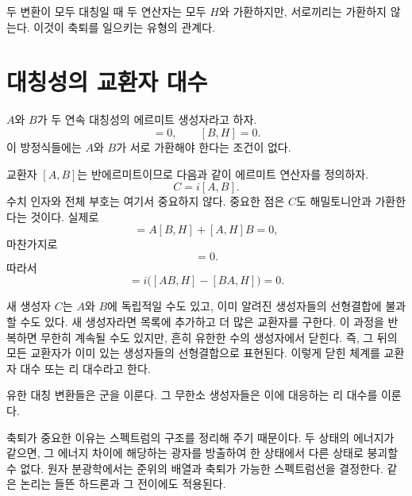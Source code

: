 두 변환이 모두 대칭일 때 두 연산자는 모두 \(H\)와 가환하지만, 서로끼리는 가환하지 않는다. 이것이 축퇴를 일으키는 유형의 관계다.

\begin{classroomqa}
\end{classroomqa}

\section{대칭성의 교환자 대수}

\(A\)와 \(B\)가 두 연속 대칭성의 에르미트 생성자라고 하자.
\begin{equation}
[A,H]=0,
\qquad
[B,H]=0.
\end{equation}
이 방정식들에는 \(A\)와 \(B\)가 서로 가환해야 한다는 조건이 없다.

교환자 \([A,B]\)는 반에르미트이므로 다음과 같이 에르미트 연산자를 정의하자.
\begin{equation}
C=i[A,B].
\end{equation}
수치 인자와 전체 부호는 여기서 중요하지 않다. 중요한 점은 \(C\)도 해밀토니안과 가환한다는 것이다. 실제로
\begin{equation}
[AB,H]
=A[B,H]+[A,H]B=0,
\end{equation}
마찬가지로
\begin{equation}
[BA,H]=0.
\end{equation}
따라서
\begin{equation}
[C,H]
=i\bigl([AB,H]-[BA,H]\bigr)=0.
\end{equation}

새 생성자 \(C\)는 \(A\)와 \(B\)에 독립적일 수도 있고, 이미 알려진 생성자들의 선형결합에 불과할 수도 있다. 새 생성자라면 목록에 추가하고 더 많은 교환자를 구한다. 이 과정을 반복하면 무한히 계속될 수도 있지만, 흔히 유한한 수의 생성자에서 닫힌다. 즉, 그 뒤의 모든 교환자가 이미 있는 생성자들의 선형결합으로 표현된다. 이렇게 닫힌 체계를 교환자 대수 또는 리 대수라고 한다.

유한 대칭 변환들은 군을 이룬다. 그 무한소 생성자들은 이에 대응하는 리 대수를 이룬다.

축퇴가 중요한 이유는 스펙트럼의 구조를 정리해 주기 때문이다. 두 상태의 에너지가 같으면, 그 에너지 차이에 해당하는 광자를 방출하여 한 상태에서 다른 상태로 붕괴할 수 없다. 원자 분광학에서는 준위의 배열과 축퇴가 가능한 스펙트럼선을 결정한다. 같은 논리는 들뜬 하드론과 그 전이에도 적용된다.

